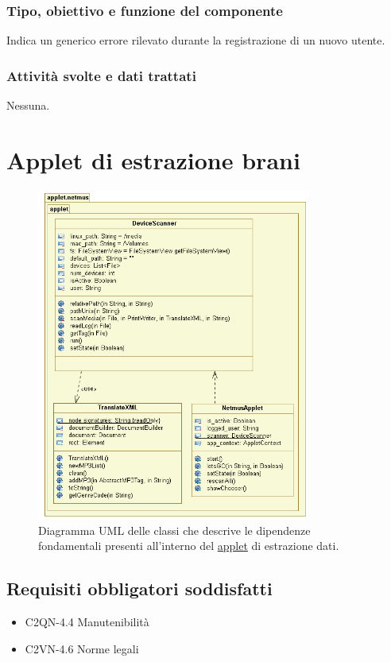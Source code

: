 \subsubsection*{Tipo, obiettivo e funzione del componente}
Indica un generico errore rilevato durante la registrazione di un nuovo utente.
\subsubsection*{Attivit\`a svolte e dati trattati}
Nessuna.


\newpage
\section{Applet di estrazione brani}

\begin{figure}[!h]
  \centering
  \includegraphics[width=9cm]{img/DP/applet.png}
\caption{Diagramma UML delle classi che descrive le dipendenze
fondamentali presenti all'interno del \underline{applet} di estrazione dati.}
\end{figure}

\subsection*{Requisiti obbligatori soddisfatti}
\begin{itemize}
	\item C2QN-4.4 Manutenibilit\`a
	\item C2VN-4.6 Norme legali
\end{itemize}
